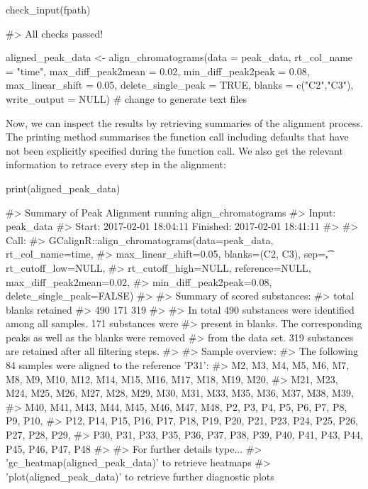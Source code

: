 \begin{Schunk}
\begin{Sinput}
check_input(fpath)
\end{Sinput}
\begin{Soutput}
#> All checks passed!
\end{Soutput}
\end{Schunk}

\begin{Schunk}
\begin{Sinput}
aligned_peak_data <- align_chromatograms(data = peak_data,
        rt_col_name = "time",
        max_diff_peak2mean = 0.02,
        min_diff_peak2peak = 0.08,
        max_linear_shift = 0.05,
        delete_single_peak = TRUE,
        blanks = c("C2","C3"), 
        write_output = NULL) # change to generate text files
\end{Sinput}
\end{Schunk}

Now, we can inspect the results by retrieving summaries of the alignment
process. The printing method summarises the function call including
defaults that have not been explicitly specified during the function
call. We also get the relevant information to retrace every step in the
alignment:

\begin{Schunk}
\begin{Sinput}
print(aligned_peak_data)
\end{Sinput}
\begin{Soutput}
#> Summary of Peak Alignment running align_chromatograms
#> Input: peak_data
#> Start:  2017-02-01 18:04:11  Finished:  2017-02-01 18:41:11 
#> 
#> Call:
#>   GCalignR::align_chromatograms(data=peak_data, rt_col_name=time,
#>   max_linear_shift=0.05, blanks=(C2, C3), sep=\t, rt_cutoff_low=NULL,
#>   rt_cutoff_high=NULL, reference=NULL, max_diff_peak2mean=0.02,
#>   min_diff_peak2peak=0.08, delete_single_peak=FALSE)
#> 
#> Summary of scored substances:
#>    total   blanks retained 
#>      490      171      319 
#> 
#> In total 490 substances were identified among all samples. 171 substances were
#>   present in blanks. The corresponding peaks as well as the blanks were removed
#>   from the data set. 319 substances are retained after all filtering steps.
#> 
#> Sample overview:
#>   The following 84 samples were aligned to the reference 'P31':
#>   M2, M3, M4, M5, M6, M7, M8, M9, M10, M12, M14, M15, M16, M17, M18, M19, M20,
#>   M21, M23, M24, M25, M26, M27, M28, M29, M30, M31, M33, M35, M36, M37, M38, M39,
#>   M40, M41, M43, M44, M45, M46, M47, M48, P2, P3, P4, P5, P6, P7, P8, P9, P10,
#>   P12, P14, P15, P16, P17, P18, P19, P20, P21, P23, P24, P25, P26, P27, P28, P29,
#>   P30, P31, P33, P35, P36, P37, P38, P39, P40, P41, P43, P44, P45, P46, P47, P48
#> 
#> For further details type...
#>   'gc_heatmap(aligned_peak_data)' to retrieve heatmaps
#>   'plot(aligned_peak_data)' to retrieve further diagnostic plots
\end{Soutput}
\end{Schunk}

